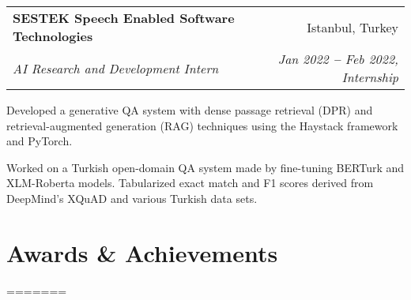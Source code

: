 \documentclass[letterpaper,11pt]{article}
\makeatletter
\newcommand{\resumeItem}[1]{\item\small{{#1 \vspace{-2pt}}}}
\newcommand{\resumeSubheading}[4]{\vspace{-2pt}\item
    \begin{tabular*}{0.97\textwidth}[t]{l@{\extracolsep{\fill}}r}
      \textbf{#1} & #2 \\
      \textit{\small#3} & \textit{\small #4} \\
    \end{tabular*}\vspace{-7pt}
}
\makeatother
\begin{document}
    \resumeSubheading
      {SESTEK Speech Enabled Software Technologies}{Istanbul, Turkey}
      {AI Research and Development Intern}{Jan 2022 \textbf{--} Feb 2022, Internship}
        \resumeItemListStart
            \resumeItem{Developed a generative QA system with dense passage retrieval (DPR) and retrieval-augmented generation (RAG) techniques using the Haystack framework and PyTorch.}
            \resumeItem{Worked on a Turkish open-domain QA system made by fine-tuning BERTurk and XLM-Roberta models. Tabularized exact match and F1 scores derived from DeepMind's XQuAD and various Turkish data sets.}
        \resumeItemListEnd

    
  \resumeSubHeadingListEnd




\section{Awards \& Achievements}
  \vspace{2pt}
  \resumeSubHeadingListStart
=======
\end{document}

